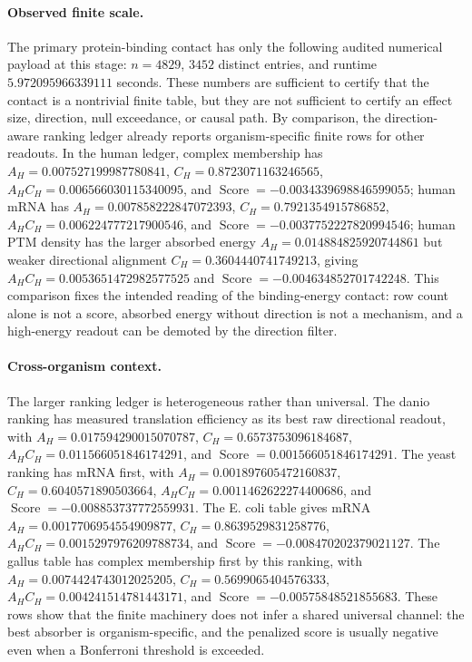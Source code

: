 \paragraph{Observed finite scale.}
The primary protein-binding contact has only the following audited numerical payload at this stage: $n=4829$, $3452$ distinct entries, and runtime $5.972095966339111$ seconds.  These numbers are sufficient to certify that the contact is a nontrivial finite table, but they are not sufficient to certify an effect size, direction, null exceedance, or causal path.  By comparison, the direction-aware ranking ledger already reports organism-specific finite rows for other readouts.  In the human ledger, complex membership has $A_H=0.007527199987780841$, $C_H=0.8723071163246565$, $A_HC_H=0.006566030115340095$, and $\operatorname{Score}=-0.0034339698846599055$; human mRNA has $A_H=0.007858222847072393$, $C_H=0.7921354915786852$, $A_HC_H=0.006224777217900546$, and $\operatorname{Score}=-0.0037752227820994546$; human PTM density has the larger absorbed energy $A_H=0.014884825920744861$ but weaker directional alignment $C_H=0.3604440741749213$, giving $A_HC_H=0.0053651472982577525$ and $\operatorname{Score}=-0.004634852701742248$.  This comparison fixes the intended reading of the binding-energy contact: row count alone is not a score, absorbed energy without direction is not a mechanism, and a high-energy readout can be demoted by the direction filter.

\paragraph{Cross-organism context.}
The larger ranking ledger is heterogeneous rather than universal.  The danio ranking has measured translation efficiency as its best raw directional readout, with $A_H=0.017594290015070787$, $C_H=0.6573753096184687$, $A_HC_H=0.011566051846174291$, and $\operatorname{Score}=0.001566051846174291$.  The yeast ranking has mRNA first, with $A_H=0.001897605472160837$, $C_H=0.6040571890503664$, $A_HC_H=0.0011462622274400686$, and $\operatorname{Score}=-0.008853737772559931$.  The E. coli table gives mRNA $A_H=0.0017706954554909877$, $C_H=0.8639529831258776$, $A_HC_H=0.0015297976209788734$, and $\operatorname{Score}=-0.008470202379021127$.  The gallus table has complex membership first by this ranking, with $A_H=0.0074424743012025205$, $C_H=0.5699065404576333$, $A_HC_H=0.004241514781443171$, and $\operatorname{Score}=-0.00575848521855683$.  These rows show that the finite machinery does not infer a shared universal channel: the best absorber is organism-specific, and the penalized score is usually negative even when a Bonferroni threshold is exceeded.

